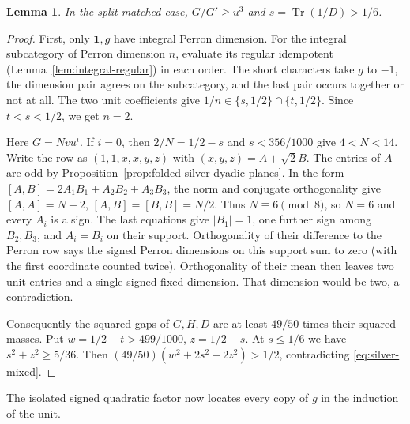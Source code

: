 \documentclass[11pt,reqno]{amsart}
\newtheorem{lemma}[theorem]{Lemma}
\theoremstyle{remark}\newtheorem{remark}[theorem]{Remark}
\numberwithin{equation}{section}
\begin{document}
\begin{lemma}\label{lem:split-ordinary-gap}
In the split matched case, $G/G'\ge u^3$ and $s=\operatorname{Tr}(1/D)>1/6$.
\end{lemma}
\begin{proof}
First, only $\mathbf1,g$ have integral Perron dimension. For the
integral subcategory of Perron dimension $n$, evaluate its regular
idempotent (Lemma~\ref{lem:integral-regular}) in each order. The
short characters take $g$ to $-1$, the dimension pair agrees on
the subcategory, and the last pair occurs together or not at all.
The two unit coefficients give $1/n\in\{s,1/2\}\cap\{t,1/2\}$.
Since $t<s<1/2$, we get $n=2$.

Here $G=Nvu^i$. If $i=0$, then $2/N=1/2-s$ and $s<356/1000$
give $4<N<14$. Write the row as $(1,1,x,x,y,z)$ with
$(x,y,z)=A+\sqrt2 B$. The entries of $A$ are odd by
Proposition~\ref{prop:folded-silver-dyadic-planes}. In the form
$[A,B]=2A_1B_1+A_2B_2+A_3B_3$, the norm and conjugate
orthogonality give $[A,A]=N-2$, $[A,B]=[B,B]=N/2$.
Thus $N\equiv6\pmod8$, so $N=6$ and every $A_i$ is a sign.
The last equations give $|B_1|=1$, one further sign among $B_2,B_3$,
and $A_i=B_i$ on their support. Orthogonality of their difference to the Perron row says the
signed Perron dimensions on this support sum to zero (with the
first coordinate counted twice). Orthogonality of their mean
then leaves two unit entries and a single signed fixed dimension. That dimension would be two, a contradiction.

Consequently the squared gaps of $G,H,D$ are at least $49/50$
times their squared masses. Put $w=1/2-t>499/1000$, $z=1/2-s$.
At $s\le1/6$ we have $s^2+z^2\ge5/36$. Then
$(49/50)(w^2+2s^2+2z^2)>1/2$, contradicting
\eqref{eq:silver-mixed}.
\end{proof}

The isolated signed quadratic factor now locates every copy of $g$
in the induction of the unit.
\end{document}
